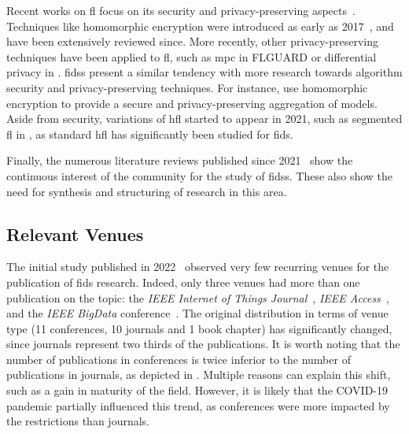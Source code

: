 Recent works on \gls{fl} focus on its security and privacy-preserving aspects~\cite{nguyen_PoisoningAttacksFederated_2020b,lyu_ThreatsFederatedLearning_2020,mothukuri_surveysecurityprivacy_2021}.
Techniques like homomorphic encryption were introduced as early as 2017~\cite{hardy_Privatefederatedlearning_2017}, and have been extensively reviewed since.
More recently, other privacy-preserving techniques have been applied to \gls{fl}, such as \gls{mpc} in FLGUARD
\cite{nguyen_FLGUARDSecurePrivate_2021} or differential privacy in \cite{kim_FederatedLearningLocal_2021}.
\Glspl{fids} present a similar tendency with more research towards algorithm security and privacy-preserving techniques.
For instance, \textcite{li_DeepFedFederatedDeep_2020} use homomorphic encryption to provide a secure and privacy-preserving aggregation of models.
Aside from security, variations of \gls{hfl} started to appear in 2021, such as segmented \gls{fl} in
\cite{sun_AdaptiveFederatedLearning_2020}, as standard \gls{hfl} has significantly been studied for \gls{fids}.

Finally, the numerous literature reviews published since 2021~\cite{agrawal_FederatedLearningintrusion_2022,alazab_FederatedLearningCybersecurity_2021,campos_EvaluatingFederatedLearning_2022,lavaur_tnsm_2022,fedorchenko_ComparativeReviewIntrusion_2022,ghimire_RecentAdvancesFederated_2022,ismaila_ReviewApproachesFederated_2024} show the
continuous interest of the community for the study of \glspl{fids}.
These also show the need for synthesis and structuring of research in this area.


\subsection{Relevant Venues\label{sec:sota.quanti.venues}}

The initial study published in 2022~\cite{lavaur_tnsm_2022} observed very few recurring venues for the publication of \gls{fids} research.
Indeed, only three venues had more than one publication on the topic: the \emph{IEEE Internet of Things Journal}~\cite{popoola_FederatedDeepLearning_2021,zhang_BlockchainbasedFederatedLearning_2020}, \emph{IEEE
Access}~\cite{chen_IntrusionDetectionWireless_2020,li_DistributedNetworkIntrusion_2020}, and the \emph{IEEE BigData} conference~\cite{cetin_FederatedWirelessNetwork_2019,fan_IoTDefenderFederatedTransfer_2020}.
The original distribution in terms of venue type (11 conferences, 10 journals and 1 book chapter) has significantly changed, since journals represent two thirds of the publications.
It is worth noting that the number of publications in conferences is twice inferior to the number of publications in journals, as depicted in .
Multiple reasons can explain this shift, such as a gain in maturity of the field.
However, it is likely that the COVID-19 pandemic partially influenced this trend, as conferences were more impacted by the restrictions than journals.

